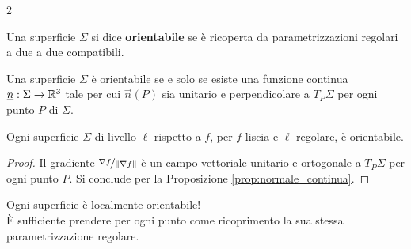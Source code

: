 \begin{multicols*}{2}
    \begin{definition}
        Una superficie $\Sigma$ si dice \textbf{orientabile} se è ricoperta
        da parametrizzazioni regolari a due a due compatibili.
    \end{definition}

    \begin{proposition} \label{prop:normale_continua}
        Una superficie $\Sigma$ è orientabile se e solo se esiste una
        funzione continua ${\underline{n}} : \Sigma \to \mathbb{R}^3$ tale per cui
        $\vec{n}(P)$ sia unitario e perpendicolare a $T_P \Sigma$ per
        ogni punto $P$ di $\Sigma$.
    \end{proposition}


    \begin{corollary}
        Ogni superficie $\Sigma$ di livello $\ell$ rispetto a $f$, per $f$ liscia e $\ell$ regolare, è orientabile.
    \end{corollary}

    \begin{proof}
        Il gradiente $\nicefrac{\nabla f}{\left\lVert \nabla f \right\rVert}$ è un campo vettoriale unitario e
        ortogonale a $T_P \Sigma$ per ogni punto $P$. Si conclude per la Proposizione \ref{prop:normale_continua}.
    \end{proof}

    \begin{warn}
        Ogni superficie è localmente orientabile! \\[0.5em]
        È sufficiente prendere per ogni
        punto come ricoprimento la sua stessa parametrizzazione regolare.
    \end{warn}
\end{multicols*}